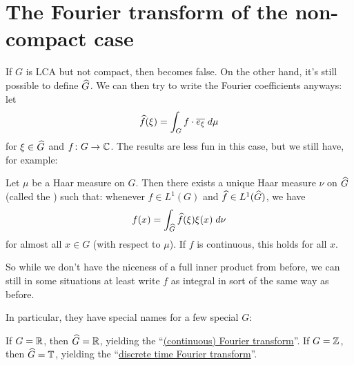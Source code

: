 \section{The Fourier transform of the non-compact case}
If $G$ is LCA but not compact, then  becomes false.
On the other hand, it's still possible to define $\widehat G$.
We can then try to write the Fourier coefficients anyways:
let \[ \widehat f(\xi) = \int_G f \cdot \overline{e_\xi} \; d\mu \]
for $\xi \in \widehat G$ and $f \colon G \to \mathbb C$.
The results are less fun in this case, but we still have, for example:
\begin{theorem}
	Let $\mu$ be a Haar measure on $G$.
	Then there exists a unique Haar measure $\nu$ on $\widehat G$
	(called the ) such that:
	whenever $f \in L^1(G)$ and $\widehat f \in L^1(\widehat G)$, we have
	\[ f(x) = \int_{\widehat G} \widehat f(\xi) \xi(x) \; d\nu \]
	for almost all $x \in G$ (with respect to $\mu$).
	If $f$ is continuous, this holds for all $x$.
\end{theorem}
So while we don't have the niceness of a full inner product from before,
we can still in some situations at least write $f$ as integral
in sort of the same way as before.

In particular, they have special names for a few special $G$:
\begin{itemize}
	\ii If $G = \mathbb R$, then $\widehat G = \mathbb R$,
	yielding the
	``\href{https://en.wikipedia.org/wiki/Fourier_transform}{(continuous) Fourier transform}''.
	\ii If $G = \mathbb Z$, then $\widehat G = \mathbb T$,
	yielding the
	``\href{https://en.wikipedia.org/wiki/Discrete-time_Fourier_transform}{discrete time Fourier transform}''.
\end{itemize}

